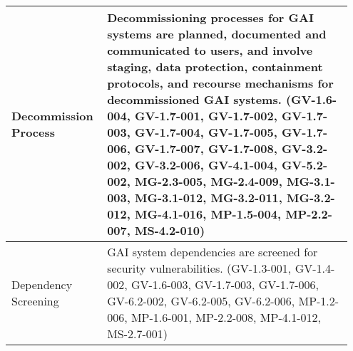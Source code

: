 \documentclass[fleqn]{article}
\begin{document}
\begin{table}[H]
\begin{tabular}{|m{0.25\linewidth} |m{0.70\linewidth} |}
		Decommission Process & Decommissioning processes for GAI systems are planned, documented and communicated to users, and involve staging, data protection, containment protocols, and recourse mechanisms for decommissioned GAI systems. (GV-1.6-004, GV-1.7-001, GV-1.7-002, GV-1.7-003, GV-1.7-004, GV-1.7-005, GV-1.7-006, GV-1.7-007, GV-1.7-008, GV-3.2-002, GV-3.2-006, GV-4.1-004, GV-5.2-002, MG-2.3-005, MG-2.4-009, MG-3.1-003, MG-3.1-012, MG-3.2-011, MG-3.2-012, MG-4.1-016, MP-1.5-004, MP-2.2-007, MS-4.2-010) \\ \hline
		Dependency Screening  & GAI system dependencies are screened for security vulnerabilities. (GV-1.3-001, GV-1.4-002, GV-1.6-003, GV-1.7-003, GV-1.7-006, GV-6.2-002, GV-6.2-005, GV-6.2-006, MP-1.2-006, MP-1.6-001, MP-2.2-008, MP-4.1-012, MS-2.7-001) \\ \hline
	\end{tabular}
\end{table}		
\pagebreak	
		
\end{document}
